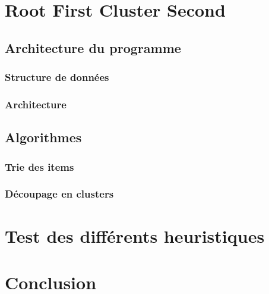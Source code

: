 \documentclass[twoside,UTF8]{EPURapport}
\begin{document}

\chapter{Root First Cluster Second}

\section{Architecture du programme}

\subsection{Structure de données}

\subsection{Architecture}

\section{Algorithmes}

\subsection{Trie des items}

\subsection{Découpage en clusters}



\chapter{Test des différents heuristiques}
\label{chap:test}

\chapter{Conclusion}

\end{document}

